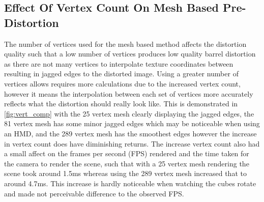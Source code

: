 \documentclass[]{article}
\begin{document}
\subsection{Effect Of Vertex Count On Mesh Based Pre-Distortion}
The number of vertices used for the mesh based method affects the distortion quality such that a low number of vertices produces low quality barrel distortion as there are not many vertices to interpolate texture coordinates between resulting in jagged edges to the distorted image. Using a greater number of vertices allows requires more calculations due to the increased vertex count, however it means the interpolation between each set of vertices more accurately reflects what the distortion should really look like. This is demonstrated in \autoref{fig:vert_comp} with the 25 vertex mesh clearly displaying the jagged edges, the 81 vertex mesh has some minor jagged edges which may be noticeable when using an HMD, and the 289 vertex mesh has the smoothest edges however the increase in vertex count does have diminishing returns. The increase vertex count also had a small affect on the frames per second (FPS) rendered and the time taken for the camera to render the scene, such that with a 25 vertex mesh rendering the scene took around 1.5ms whereas using the 289 vertex mesh increased that to around 4.7ms. This increase is hardly noticeable when watching the cubes rotate and made not perceivable difference to the observed FPS.
\end{document}

